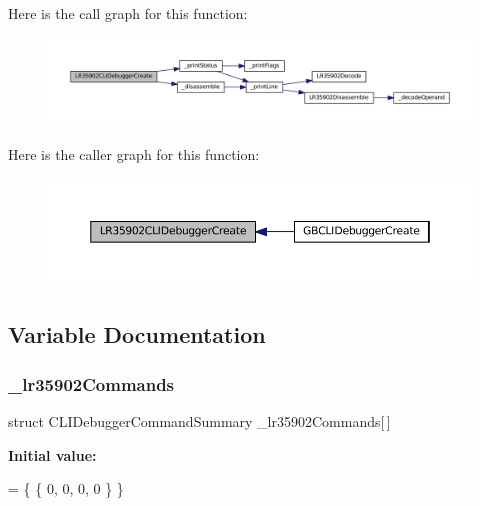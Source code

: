 Here is the call graph for this function\+:
\nopagebreak
\begin{figure}[H]
\begin{center}
\leavevmode
\includegraphics[width=350pt]{lr35902_2debugger_2cli-debugger_8c_ac552e15579f9549416a7d86250b83460_cgraph}
\end{center}
\end{figure}
Here is the caller graph for this function\+:
\nopagebreak
\begin{figure}[H]
\begin{center}
\leavevmode
\includegraphics[width=350pt]{lr35902_2debugger_2cli-debugger_8c_ac552e15579f9549416a7d86250b83460_icgraph}
\end{center}
\end{figure}


\subsection{Variable Documentation}
\mbox{\label{lr35902_2debugger_2cli-debugger_8c_aa99e2662f04c0ce3b3973ab1da121f71}} 
\subsubsection{\texorpdfstring{\+\_\+lr35902\+Commands}{\_lr35902Commands}}
{\footnotesize\ttfamily struct C\+L\+I\+Debugger\+Command\+Summary \+\_\+lr35902\+Commands\mbox{[}$\,$\mbox{]}\hspace{0.3cm}{\ttfamily [static]}}

{\bfseries Initial value\+:}
\begin{DoxyCode}
= \{
    \{ 0, 0, 0, 0 \}
\}
\end{DoxyCode}
